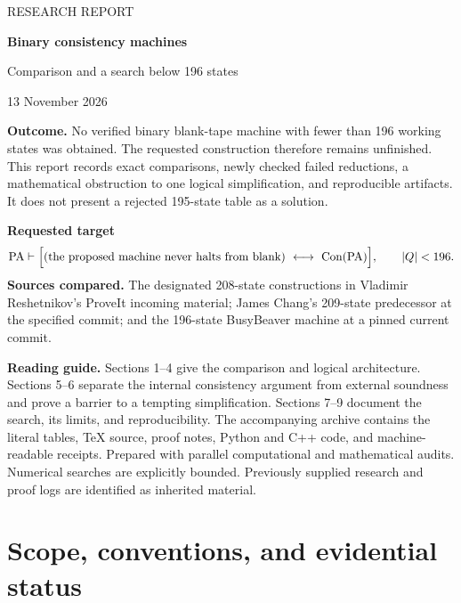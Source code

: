 \documentclass[11pt,a4paper]{article}
\newcommand{\PA}{\mathrm{PA}}
\newcommand{\Con}{\operatorname{Con}}
\begin{document}
\begin{titlepage}
\vspace*{15mm}
{\color{teal}\large RESEARCH REPORT}\par\vspace{7mm}
{\color{navy}\Huge\bfseries Binary consistency machines}\par\vspace{5mm}
{\LARGE Comparison and a search below 196 states}\par\vspace{12mm}
{\large 13 November 2026}\par\vspace{18mm}
\colorbox{light}{\parbox{0.94\textwidth}{\vspace{3mm}\textbf{Outcome.} No verified binary blank-tape machine with fewer than 196 working states was obtained. The requested construction therefore remains unfinished. This report records exact comparisons, newly checked failed reductions, a mathematical obstruction to one logical simplification, and reproducible artifacts. It does not present a rejected 195-state table as a solution.\vspace{3mm}}}\par
\vspace{12mm}
\textbf{Requested target}
\[
\PA\vdash\Bigl[(\text{the proposed machine never halts from blank})
\ \longleftrightarrow\ \Con(\PA)\Bigr],
\qquad |Q|<196.
\]
\textbf{Sources compared.} The designated 208-state constructions in Vladimir Reshetnikov's ProveIt incoming material; James Chang's 209-state predecessor at the specified commit; and the 196-state BusyBeaver machine at a pinned current commit.

\textbf{Reading guide.} Sections 1--4 give the comparison and logical architecture. Sections 5--6 separate the internal consistency argument from external soundness and prove a barrier to a tempting simplification. Sections 7--9 document the search, its limits, and reproducibility. The accompanying archive contains the literal tables, TeX source, proof notes, Python and C++ code, and machine-readable receipts.
\vfill
\small Prepared with parallel computational and mathematical audits. Numerical searches are explicitly bounded. Previously supplied research and proof logs are identified as inherited material.
\end{titlepage}
\tableofcontents
\newpage

\section{Scope, conventions, and evidential status}
\end{document}
